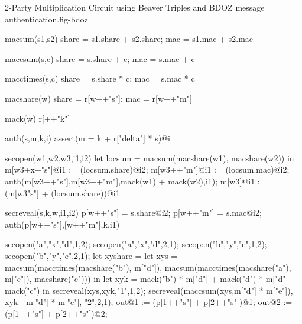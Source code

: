 \begin{fpfig}[t]{2-Party Multiplication Circuit using Beaver Triples and BDOZ message authentication.}{fig-bdoz}
{\footnotesize
  \begin{verbatimtab}
    macsum(s1,s2)
    { { share = s1.share + s2.share; mac = s1.mac + s2.mac } }
    
    maccsum(s,c)
    { { share = s.share + c; mac = s.mac + c } }
    
    macctimes(s,c)
    { { share = s.share * c; mac = s.mac * c } }
    
    macshare(w) { {  share = r[w++"s"]; mac = r[w++"m"] } }

    mack(w) { r[++"k"] }
    
    auth(s,m,k,i) { assert(m = k + r["delta"] * s)@i }
    
    secopen(w1,w2,w3,i1,i2)
    {
      let locsum =  macsum(macshare(w1), macshare(w2)) in
      m[w3+x+"s"]@i1 := (locsum.share)@i2;
      m[w3++"m"]@i1 := (locsum.mac)@i2;
      auth(m[w3++"s"],m[w3++"m"],mack(w1) + mack(w2),i1);
      m[w3]@i1 := (m[w3"s"] + (locsum.share))@i1
    }

    secreveal(s,k,w,i1,i2)
    {
      p[w++"s"] = s.share@i2;
      p[w++"m"] = s.mac@i2;
      auth(p[w++"s"],[w++"m"],k,i1)    
    }

    secopen("a","x","d",1,2);
    secopen("a","x","d",2,1);
    secopen("b","y","e",1,2);
    secopen("b","y","e",2,1);
    let xyshare = 
    let xys =
      macsum(macctimes(macshare("b"), m["d"]),
             macsum(macctimes(macshare("a"), m["e"]),
                    macshare("c")))
    in
    let xyk = mack("b") * m["d"] + mack("d") * m["d"] + mack("c")               
    in
    secreveal(xys,xyk,"1",1,2);
    secreveal(maccsum(xys,m["d"] * m["e"]),
              xyk - m["d"] * m["e"],
              "2",2,1);
    out@1 := (p[1++"s"] + p[2++"s"])@1;
    out@2 := (p[1++"s"] + p[2++"s"])@2;
  \end{verbatimtab}
}
\end{fpfig}

    
